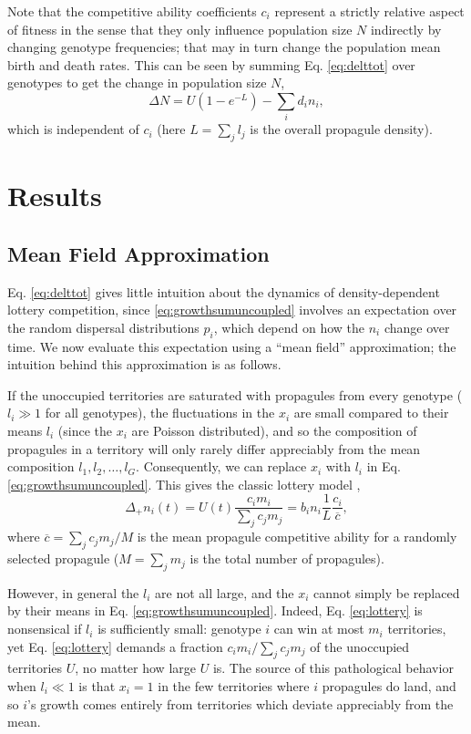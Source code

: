 \documentclass[11pt]{article}
\begin{document}
Note that the competitive ability coefficients $c_i$ represent a strictly relative aspect of fitness in the sense that they only influence population size $N$ indirectly by changing genotype frequencies; that may in turn change the population mean birth and death rates. This can be seen by summing Eq. \eqref{eq:delttot} over genotypes to get the  change in population size $N$, 
\begin{equation}
\Delta N=U(1-e^{-L})-\sum_i d_i n_i,\label{eq:deltN}
\end{equation}
which is independent of $c_i$ (here $L=\sum_j l_j$ is the overall propagule density).

\section*{Results}

\subsection*{Mean Field Approximation}

Eq. \eqref{eq:delttot} gives little intuition about the dynamics of density-dependent lottery competition, since \eqref{eq:growthsumuncoupled} involves an expectation over the random dispersal distributions $p_i$, which depend on how the $n_i$ change over time. We now evaluate this expectation using a ``mean field'' approximation; the intuition behind this approximation is as follows.

If the unoccupied territories are saturated with propagules from every genotype ($l_i\gg 1$ for all genotypes), the fluctuations in the $x_i$ are small compared to their means $l_i$ (since the $x_i$ are Poisson distributed), and so the composition of propagules in a territory will only rarely differ appreciably from the mean composition $l_1,l_2,\ldots,l_G$. Consequently, we can replace $x_i$ with $l_i$ in Eq. \eqref{eq:growthsumuncoupled}. This gives the classic lottery model \citep{chesson_1981},
\begin{equation}
\Delta_+ n_i(t)=U(t)\frac{c_i m_i}{\sum_j c_j m_j}= b_i n_i\frac{1}{L}\frac{c_i}{\overline{c}}, \label{eq:lottery}
\end{equation}
where $\overline{c}=\sum_j c_j m_j/M$ is the mean propagule competitive ability for a randomly selected propagule ($M=\sum_j m_j$ is the total number of propagules). 

However, in general the $l_i$ are not all large, and the $x_i$ cannot simply be replaced by their means in Eq. \eqref{eq:growthsumuncoupled}. Indeed, Eq. \eqref{eq:lottery} is nonsensical if $l_i$ is sufficiently small: genotype $i$ can win at most $m_i$ territories, yet Eq. \eqref{eq:lottery} demands a fraction $c_i m_i/\sum_j c_j m_j$ of the unoccupied territories $U$, no matter how large $U$ is. The source of this pathological behavior when $l_i\ll 1$ is that $x_i=1$ in the few territories where $i$ propagules do land, and so $i$'s growth comes entirely from territories which deviate appreciably from the mean.  
\end{document}
